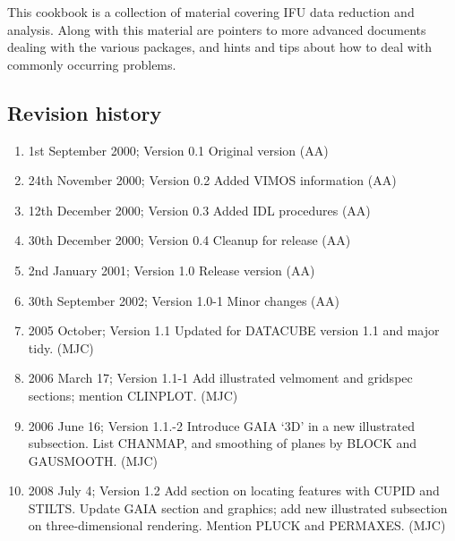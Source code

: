\documentclass[twoside,11pt]{article}
\newcommand{\stardocabstract}
{This cookbook is a collection of material covering IFU data reduction and analysis. Along 
with this material are pointers to more advanced documents dealing with the various packages,
and hints and tips about how to deal with commonly occurring problems.}
\begin{document}
\newenvironment{refs}{\vspace{-4ex} %
                      \begin{list}{}{\setlength{\topsep}{0mm}
                                     \setlength{\partopsep}{0mm}
                                     \setlength{\itemsep}{0mm}
                                     \setlength{\parsep}{0mm}
                                     \setlength{\leftmargin}{1.5em}
                                     \setlength{\itemindent}{-\leftmargin}
                                     \setlength{\labelsep}{0mm}
                                     \setlength{\labelwidth}{0mm}}
                    }{\end{list}}



\stardocabstract
 \newpage
 \vspace{3cm}

 \subsection*{Revision history}

 \begin{enumerate}
   \item 1st September 2000; Version 0.1 Original version (AA) 
   \item 24th November 2000; Version 0.2 Added VIMOS information (AA)
   \item 12th December 2000; Version 0.3 Added IDL procedures (AA)
   \item 30th December 2000; Version 0.4 Cleanup for release (AA)
   \item 2nd January 2001; Version 1.0 Release version (AA)
   \item 30th September 2002; Version 1.0-1 Minor changes (AA)
   \item 2005 October; Version 1.1  Updated for DATACUBE version 1.1
                                    and major tidy. (MJC)
  \item 2006 March 17; Version 1.1-1 Add illustrated velmoment and gridspec 
                       sections; mention CLINPLOT. (MJC)
  \item 2006 June 16; Version 1.1.-2 Introduce GAIA `3D' in a new 
                      illustrated subsection.  List CHANMAP, and smoothing 
                      of planes by BLOCK and GAUSMOOTH. (MJC)
  \item 2008 July 4;  Version 1.2  Add section on locating features with CUPID 
                      and STILTS.  Update GAIA section and graphics; add new 
                      illustrated subsection on three-dimensional rendering.  
                      Mention PLUCK and PERMAXES.  (MJC)

 \end{enumerate}
\end{document}
